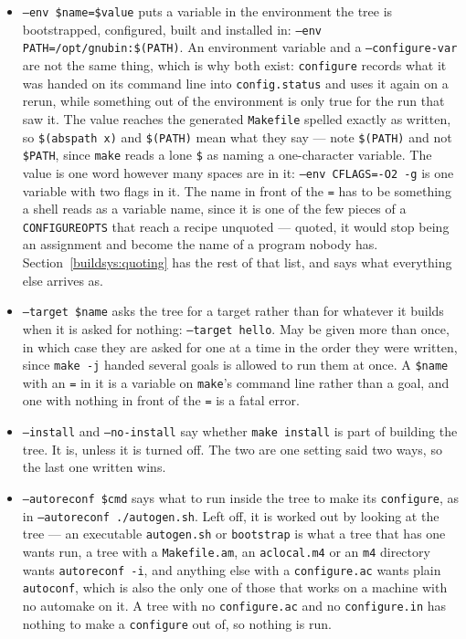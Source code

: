 \documentclass{article}
\begin{document}
\begin{itemize}
\item \texttt{--env \$name=\$value} puts a variable in the environment
  the tree is bootstrapped, configured, built and installed in:
  \texttt{--env PATH=/opt/gnubin:\$(PATH)}.  An environment variable
  and a \texttt{--configure-var} are not the same thing, which is why
  both exist: \texttt{configure} records what it was handed on its
  command line into \texttt{config.status} and uses it again on a
  rerun, while something out of the environment is only true for the
  run that saw it.  The value reaches the generated \texttt{Makefile}
  spelled exactly as written, so \texttt{\$(abspath x)} and
  \texttt{\$(PATH)} mean what they say --- note \texttt{\$(PATH)} and
  not \texttt{\$PATH}, since \texttt{make} reads a lone \texttt{\$} as
  naming a one-character variable.  The value is one word however many
  spaces are in it: \texttt{--env CFLAGS=-O2 -g} is one variable with
  two flags in it.  The name in front of the \texttt{=} has to be
  something a shell reads as a variable name, since it is one of the
  few pieces of a \texttt{CONFIGUREOPTS} that reach a recipe unquoted
  --- quoted, it would stop being an assignment and become the name of
  a program nobody has.  Section~\ref{buildsys:quoting} has the rest
  of that list, and says what everything else arrives as.

\item \texttt{--target \$name} asks the tree for a target rather than
  for whatever it builds when it is asked for nothing:
  \texttt{--target hello}.  May be given more than once, in which case
  they are asked for one at a time in the order they were written,
  since \texttt{make -j} handed several goals is allowed to run them
  at once.  A \texttt{\$name} with an \texttt{=} in it is a variable on
  \texttt{make}'s command line rather than a goal, and one with nothing
  in front of the \texttt{=} is a fatal error.

\item \texttt{--install} and \texttt{--no-install} say whether
  \texttt{make install} is part of building the tree.  It is, unless
  it is turned off.  The two are one setting said two ways, so the
  last one written wins.

\item \texttt{--autoreconf \$cmd} says what to run inside the tree to
  make its \texttt{configure}, as in \texttt{--autoreconf
  ./autogen.sh}.  Left off, it is worked out by looking at the tree --- an executable
  \texttt{autogen.sh} or \texttt{bootstrap} is what a tree that has one
  wants run, a tree with a \texttt{Makefile.am}, an
  \texttt{aclocal.m4} or an \texttt{m4} directory wants
  \texttt{autoreconf -i}, and anything else with a
  \texttt{configure.ac} wants plain \texttt{autoconf}, which is also
  the only one of those that works on a machine with no automake on
  it.  A tree with no \texttt{configure.ac} and no
  \texttt{configure.in} has nothing to make a \texttt{configure} out
  of, so nothing is run.


\end{itemize}
\end{document}
